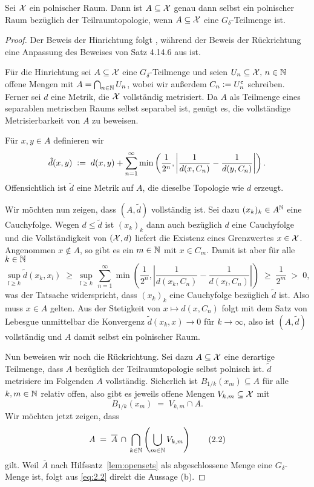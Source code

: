 \documentclass[../main/main.tex]{subfiles}
\begin{document}
	\begin{Satz}[Alexandroff]
		\label{thm:gdeltasubsetsofpolishspaces}
		Sei $\mathcal{X}$ ein polnischer Raum. Dann ist $A \subseteq \mathcal{X}$ genau dann selbst ein polnischer Raum bezüglich der Teilraumtopologie, 
		wenn $A \subseteq \mathcal{X}$ eine $G_\delta$-Teilmenge ist.
	\end{Satz}
	
	\begin{proof}
		Der Beweis der Hinrichtung folgt \cite[Satz 7]{JordanBell.2014}, während der Beweis der Rückrichtung eine Anpassung des Beweises
		von Satz 4.14.6 aus \cite[Kapitel 4.14]{Simon.2015} ist.
		
		Für die Hinrichtung sei $A \subseteq \mathcal{X}$ eine $G_\delta$-Teilmenge und seien 
		$U_n \subseteq \mathcal{X}, \, n \in \mathbb{N}$ offene Mengen mit 
		$A = \bigcap_{n \in \mathbb{N}} U_n$, wobei wir außerdem 
		$C_n \vcentcolon = U_n^{\mathsf{c}}$ schreiben. Ferner sei 
		$d$ eine Metrik, die $\mathcal{X}$ vollständig metrisiert. 
		Da $A$ als Teilmenge eines separablen metrischen Raums 
		selbst separabel ist, genügt es, die vollständige Metrisierbarkeit 
		von $A$ zu beweisen.
		
		Für $x, y \in A$ definieren wir
		\[\tilde{d}(x, y) \; \vcentcolon = \; d(x, y) + \sum_{n=1}^{\infty} \min \left(
		\frac{1}{2^n}, \left| \frac{1}{d(x, C_n)} - \frac{1}{d(y, C_n)} \right|
		\right) \text{.}\]
		Offensichtlich ist $\tilde{d}$ eine Metrik auf $A$, 
		die dieselbe Topologie wie $d$ erzeugt. 
		
		Wir möchten nun zeigen, dass $(A, \tilde{d})$ vollständig ist. 
		Sei dazu $(x_k)_k \in A^{\mathbb{N}}$ eine Cauchyfolge. Wegen $d \leq \tilde{d}$ 
		ist $(x_k)_k$ dann auch bezüglich $d$ eine Cauchyfolge und die 
		Vollständigkeit von $(\mathcal{X}, d)$ liefert die Existenz eines Grenzwertes 
		$x \in \mathcal{X}$. Angenommen $x \notin A$, so gibt es ein $m \in \mathbb{N}$ mit 
		$x \in C_m$. Damit ist aber für alle $k \in \mathbb{N}$
		$$\sup_{l \geq k} \tilde{d}(x_k, x_l) \; \geq \; \sup_{l \geq k} 
		\, \sum_{n=1}^{\infty} \min \left(
		\frac{1}{2^n}, \left| \frac{1}{d(x_k, C_n)} -
		\frac{1}{d(x_l, C_n)} \right|
		\right) \; \geq \; \frac{1}{2^m} \; > \; 0 \text{,}$$
		was der Tatsache widerspricht, dass $(x_k)_k$ eine Cauchyfolge 
		bezüglich $\tilde{d}$ ist. Also muss $x \in A$ gelten. 
		Aus der Stetigkeit von $x \mapsto d(x, C_n)$ folgt mit dem 
		Satz von Lebesgue unmittelbar die Konvergenz 
		$\tilde{d}(x_k, x) \to 0$ für $k \to \infty$,
		also ist $(A, \tilde{d})$ vollständig und $A$ damit selbst ein
		polnischer Raum.
		
		Nun beweisen wir noch die Rückrichtung. Sei dazu $A \subseteq \mathcal{X}$ eine derartige Teilmenge, dass
		$A$ bezüglich der Teilraumtopologie selbst polnisch ist. $\tilde{d}$ metrisiere im Folgenden 
		$A$ vollständig.
		Sicherlich ist $B_{1/k}(x_m) \subseteq A$ für alle 
		$k, m \in \mathbb{N}$ relativ offen, also gibt es jeweils offene Mengen 
		$V_{k, m} \subseteq \mathcal{X}$ mit
		\[ B_{1/k}(x_m) \; = \; V_{k, m} 
		\cap A \text{.} \label{eq:2.1} \tag{2.1}\]
		Wir möchten jetzt zeigen, dass
		\[ A \; = \; \overline{A} \, \cap \, 
		\bigcap_{k \in \mathbb{N}} \left( \bigcup_{m \in \mathbb{N}} V_{k, m} \right) 
		\label{eq:2.2} \tag{2.2}\]
		gilt. 
		Weil $\overline{A}$ nach Hilfssatz~\ref{lem:opensets} 
		als abgeschlossene Menge eine $G_\delta$-Menge ist, 
		folgt aus \eqref{eq:2.2} direkt die Aussage (b).
		

\end{proof}
\end{document}
